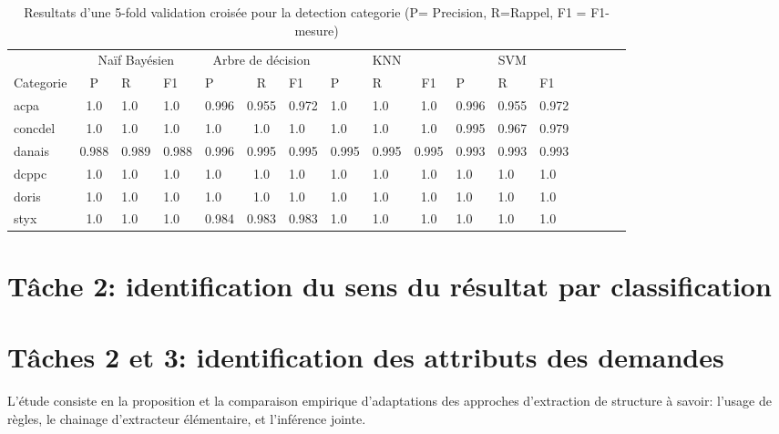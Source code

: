 \begin{table}[!h]
\scriptsize
\centering
\begin{tabular}{l|c@{\hskip 0.1in}lllc@{\hskip 0.1in}lllc@{\hskip 0.1in}lllc@{\hskip 0.1in}lll}
\hline\noalign{\smallskip}
       &   \multicolumn{3}{c}{Naïf Bayésien}    &    \multicolumn{3}{c}{Arbre de décision}   &  \multicolumn{3}{c}{KNN}  & \multicolumn{3}{c}{SVM}     \\       
\noalign{\smallskip}
\hline
\noalign{\smallskip}
  Categorie  & P     & R     & F1    & P     & R     & F1    & P     & R     & F1    & P     & R     & F1    \\        
\noalign{\smallskip}
\hline
\noalign{\smallskip}
acpa    & 1.0 & 1.0 & 1.0 & 0.996 & 0.955 & 0.972 & 1.0 & 1.0 & 1.0 & 0.996 & 0.955 & 0.972 \\
concdel & 1.0 & 1.0 & 1.0 & 1.0 & 1.0 & 1.0 & 1.0 & 1.0 & 1.0 & 0.995 & 0.967 & 0.979 \\
danais  & 0.988 & 0.989 & 0.988 & 0.996 & 0.995 & 0.995 & 0.995 & 0.995 & 0.995 & 0.993 & 0.993 & 0.993 \\
dcppc   & 1.0 & 1.0 & 1.0 & 1.0 & 1.0 & 1.0 & 1.0 & 1.0 & 1.0 & 1.0 & 1.0 & 1.0 \\
doris   & 1.0 & 1.0 & 1.0 & 1.0 & 1.0 & 1.0 & 1.0 & 1.0 & 1.0 & 1.0 & 1.0 & 1.0 \\
styx    & 1.0 & 1.0 & 1.0 & 0.984 & 0.983 & 0.983 & 1.0 & 1.0 & 1.0 & 1.0 & 1.0 & 1.0 \\
\hline
\end{tabular}
\caption{Resultats d'une 5-fold validation croisée pour la detection categorie  (P= Precision, R=Rappel, F1 = F1-mesure)}\label{tab:quanta:resultat-detect-cat}
\end{table}


\section{Tâche 2: identification du sens du résultat par classification}

\section{Tâches 2 et 3: identification des attributs des demandes}
\label{sec:quanta:attributs}

L'étude consiste en la proposition et la comparaison empirique d'adaptations des approches d'extraction de structure à savoir: l'usage de règles, le chainage d'extracteur élémentaire, et l'inférence jointe.

